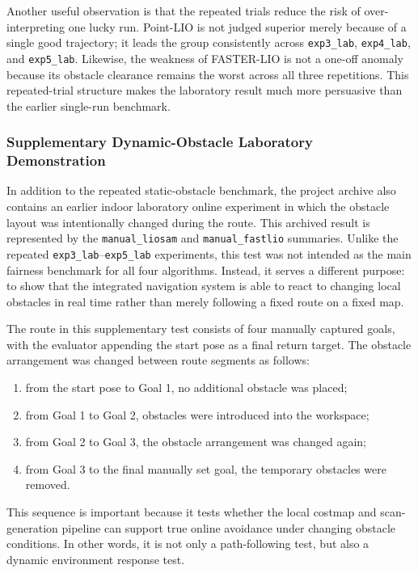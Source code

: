 \documentclass[12pt,a4paper]{report}
\begin{document}
Another useful observation is that the repeated trials reduce the risk of over-interpreting one lucky run. Point-LIO is not judged superior merely because of a single good trajectory; it leads the group consistently across \texttt{exp3\_lab}, \texttt{exp4\_lab}, and \texttt{exp5\_lab}. Likewise, the weakness of FASTER-LIO is not a one-off anomaly because its obstacle clearance remains the worst across all three repetitions. This repeated-trial structure makes the laboratory result much more persuasive than the earlier single-run benchmark.

\subsubsection{Supplementary Dynamic-Obstacle Laboratory Demonstration}
In addition to the repeated static-obstacle benchmark, the project archive also contains an earlier indoor laboratory online experiment in which the obstacle layout was intentionally changed during the route. This archived result is represented by the \texttt{manual\_liosam} and \texttt{manual\_fastlio} summaries. Unlike the repeated \texttt{exp3\_lab}--\texttt{exp5\_lab} experiments, this test was not intended as the main fairness benchmark for all four algorithms. Instead, it serves a different purpose: to show that the integrated navigation system is able to react to changing local obstacles in real time rather than merely following a fixed route on a fixed map.

The route in this supplementary test consists of four manually captured goals, with the evaluator appending the start pose as a final return target. The obstacle arrangement was changed between route segments as follows:
\begin{enumerate}[leftmargin=2em]
    \item from the start pose to Goal 1, no additional obstacle was placed;
    \item from Goal 1 to Goal 2, obstacles were introduced into the workspace;
    \item from Goal 2 to Goal 3, the obstacle arrangement was changed again;
    \item from Goal 3 to the final manually set goal, the temporary obstacles were removed.
\end{enumerate}
This sequence is important because it tests whether the local costmap and scan-generation pipeline can support true online avoidance under changing obstacle conditions. In other words, it is not only a path-following test, but also a dynamic environment response test.
\end{document}
